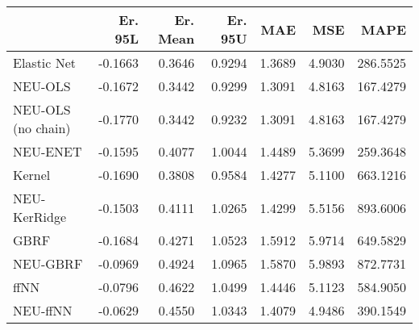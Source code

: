 \begin{tabular}{lrrrrrr}
\toprule
{} &  Er. 95L &  Er. Mean &  Er. 95U &    MAE &    MSE &     MAPE \\
\midrule
Elastic Net        &  -0.1663 &    0.3646 &   0.9294 & 1.3689 & 4.9030 & 286.5525 \\
NEU-OLS            &  -0.1672 &    0.3442 &   0.9299 & 1.3091 & 4.8163 & 167.4279 \\
NEU-OLS (no chain) &  -0.1770 &    0.3442 &   0.9232 & 1.3091 & 4.8163 & 167.4279 \\
NEU-ENET           &  -0.1595 &    0.4077 &   1.0044 & 1.4489 & 5.3699 & 259.3648 \\
Kernel             &  -0.1690 &    0.3808 &   0.9584 & 1.4277 & 5.1100 & 663.1216 \\
NEU-KerRidge       &  -0.1503 &    0.4111 &   1.0265 & 1.4299 & 5.5156 & 893.6006 \\
GBRF               &  -0.1684 &    0.4271 &   1.0523 & 1.5912 & 5.9714 & 649.5829 \\
NEU-GBRF           &  -0.0969 &    0.4924 &   1.0965 & 1.5870 & 5.9893 & 872.7731 \\
ffNN               &  -0.0796 &    0.4622 &   1.0499 & 1.4446 & 5.1123 & 584.9050 \\
NEU-ffNN           &  -0.0629 &    0.4550 &   1.0343 & 1.4079 & 4.9486 & 390.1549 \\
\bottomrule
\end{tabular}
